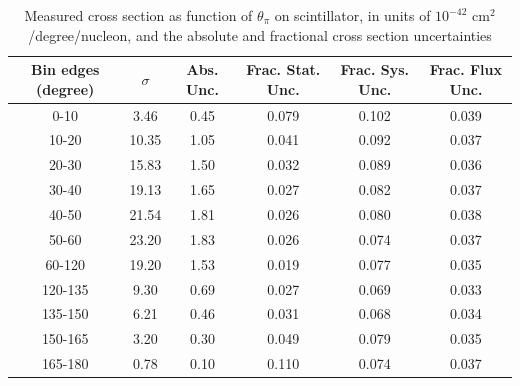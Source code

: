 \documentclass[../main.tex]{subfiles}
\begin{document}
\pagebreak
\begin{turnpage}
\end{turnpage}
\begin{table}
  \centering
  \renewcommand{\arraystretch}{1.15}
  \caption{Measured cross section as function of $\theta_{\pi}$ on scintillator, in units of $10^{-42}$ $\text{cm}^2$/degree/nucleon, and the absolute and fractional cross section uncertainties}
    \begin{tabular}{c||c|c||c|c|c}
      Bin edges (degree) &  $\sigma$  &  Abs. Unc.  &  Frac. Stat. Unc.  &  Frac. Sys. Unc.  &  Frac. Flux Unc. \\
      \hline
      \hline
      0-10 & 3.46 & 0.45 & 0.079 & 0.102 & 0.039\\
      10-20 & 10.35 & 1.05 & 0.041 & 0.092 & 0.037\\
      20-30 & 15.83 & 1.50 & 0.032 & 0.089 & 0.036\\
      30-40 & 19.13 & 1.65 & 0.027 & 0.082 & 0.037\\
      40-50 & 21.54 & 1.81 & 0.026 & 0.080 & 0.038\\
      50-60 & 23.20 & 1.83 & 0.026 & 0.074 & 0.037\\
      60-120 & 19.20 & 1.53 & 0.019 & 0.077 & 0.035\\
      120-135 & 9.30 & 0.69 & 0.027 & 0.069 & 0.033\\
      135-150 & 6.21 & 0.46 & 0.031 & 0.068 & 0.034\\
      150-165 & 3.20 & 0.30 & 0.049 & 0.079 & 0.035\\
      165-180 & 0.78 & 0.10 & 0.110 & 0.074 & 0.037
    \end{tabular}
  \label{tbl:datanucleonplasticpion_thetaa}
\end{table}
\pagebreak
\end{document}
